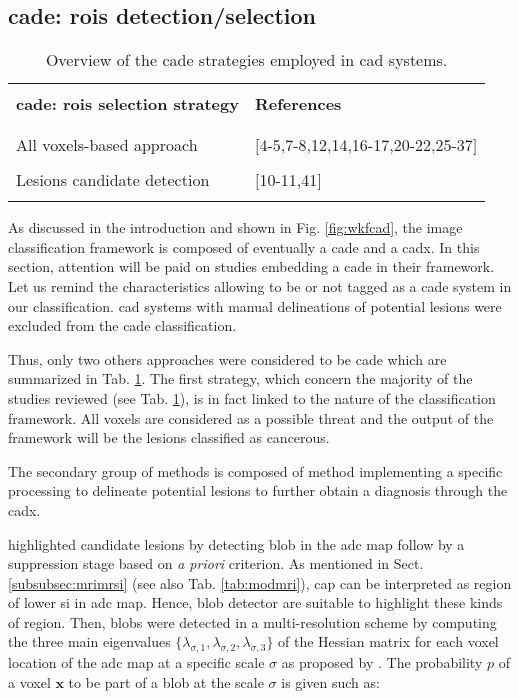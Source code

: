 \subsection{\ac{cade}: \acp{roi} detection/selection}

\begin{table}
	\caption{Overview of the \ac{cade} strategies employed in \ac{cad} systems.}
	\small
	\begin{tabular}{p{.65\linewidth} p{.25\linewidth}}
		\hline \\ [-1.5ex]
		\textbf{\ac{cade}: \acp{roi} selection strategy} & \textbf{References} \\ \\ [-1.5ex]
		\hline \\ [-1.5ex]
		\quad All voxels-based approach & $[$4-5,7-8,12,14,16-17,20-22,25-37$]$ \\ \\ [-1.5ex]
		\quad Lesions candidate detection & $[$10-11,41$]$ \\ \\ [-1.5ex]
		\hline
	\end{tabular}
	\label{tab:cade}
\end{table}

As discussed in the introduction and shown in Fig. \ref{fig:wkfcad}, the image classification framework is composed of eventually a \ac{cade} and a \ac{cadx}. In this section, attention will be paid on studies embedding a \ac{cade} in their framework. Let us remind the characteristics allowing to be or not tagged as a \ac{cade} system in our classification. \ac{cad} systems with manual delineations of potential lesions were excluded from the \ac{cade} classification.

Thus, only two others approaches were considered to be \ac{cade} which are summarized in Tab. \ref{tab:cade}. The first strategy, which concern the majority of the studies reviewed (see Tab. \ref{tab:cade}), is in fact linked to the nature of the classification framework. All voxels are considered as a possible threat and the output of the framework will be the lesions classified as cancerous.

The secondary group of methods is composed of method implementing a specific processing to delineate potential lesions to further obtain a diagnosis through the \ac{cadx}.

\cite{Vos2012} highlighted candidate lesions by detecting blob in the \ac{adc} map follow by a suppression stage based on \textit{a priori} criterion. As mentioned in Sect. \ref{subsubsec:mrimrsi} (see also Tab. \ref{tab:modmri}), \ac{cap} can be interpreted as region of lower \ac{si} in \ac{adc} map. Hence, blob detector are suitable to highlight these kinds of region. Then, blobs were detected in a multi-resolution scheme by computing the three main eigenvalues $\{ \lambda_{\sigma,1},\lambda_{\sigma,2},\lambda_{\sigma,3} \}$ of the Hessian matrix for each voxel location of the \ac{adc} map at a specific scale $\sigma$ as proposed by \cite{Li2003}. The probability $p$ of a voxel $\mathbf{x}$ to be part of a blob at the scale $\sigma$ is given such as:

